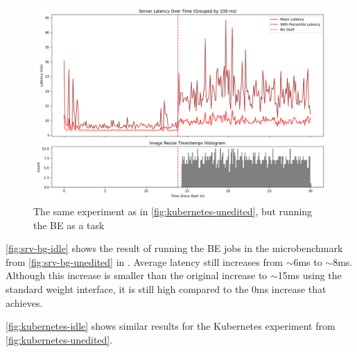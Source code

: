 \begin{figure}[t]
    \centering
    \includegraphics[width=\columnwidth]{graphs/kubernetes-idle.png}
    \caption{The same experiment as in \autoref{fig:kubernetes-unedited}, but
    running the BE as a \schedidle{} task}\label{fig:kubernetes-idle}
\end{figure}

\autoref{fig:srv-bg-idle} shows the result of running the BE jobs in the
microbenchmark from \autoref{fig:srv-bg-unedited} in \schedidle{}. Average
latency still increases from $\sim$6ms to $\sim$8ms. Although this increase is
smaller than the original increase to $\sim$15ms using the standard weight
interface, it is still high compared to the 0ms increase that \schedbe{}
achieves.

\autoref{fig:kubernetes-idle} shows similar results for the Kubernetes
experiment from \autoref{fig:kubernetes-unedited}.